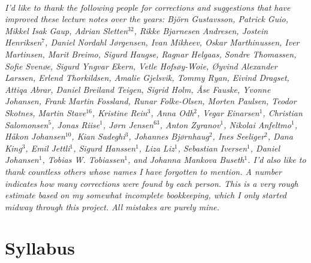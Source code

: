 \documentclass{tufte-book}
\begin{document}
\cleardoublepage
~\vfill
\begin{doublespace}
\noindent\fontsize{10}{10}\selectfont\itshape
\nohyphenation
I'd like to thank the following people for corrections and suggestions
that have improved these lecture notes over the years: Björn
Gustavsson, Patrick Guio,
Mikkel Isak Gaup, Adrian Sletten$^{32}$,
Rikke Bjarnesen Andresen, Jostein Henriksen$^7$, Daniel Nordahl Jørgensen,
Ivan Mikheev, Oskar Marthinussen, Iver Martinsen, Marit Breimo, Sigurd
Haugse, Ragnar Helgaas, Sondre Thomassen, Sofie Svenøe, Sigurd Yngvar
Ekern, Vetle Hofsøy-Woie, Øyvind Alexander Larssen, Erlend
Thorkildsen, Amalie Gjelsvik, Tommy Ryan, Eivind Dragset, Attiqa
Abrar, Daniel Breiland Teigen, Sigrid Holm, Åse Fauske, Yvonne
Johansen, Frank Martin Fossland, Runar Folke-Olsen, Morten Paulsen,
Teodor Skotnes,
Martin Stave$^{16}$, Kristine Rein$^{3}$, Anna Odh$^{2}$, Vegar
Einarsen$^{1}$, Christian Salomonsen$^{5}$, Jonas Riise$^{1}$, Jørn
Jensen$^{63}$, Anton Zyranov$^{1}$, Nikolai Anfeltmo$^{1}$, Håkon
Johansen$^{10}$, Kian Sadeghi$^{3}$, Johannes Bjørnhaug$^{2}$, Ines
Seeliger$^{2}$, Dana King$^{3}$, Emil Jettli$^{1}$, Sigurd
Hanssen$^{1}$, Liza Liz$^{1}$, Sebastian Iversen$^{1}$, Daniel
Johansen$^{1}$, Tobias W. Tobiassen$^{1}$, and Johanna Mankova
Buseth$^{1}$. I'd also like to thank countless others whose names I
have forgotten to mention. A number indicates how many corrections were
found by each person. This is a very rough estimate based on my
somewhat incomplete bookkeeping, which I only started midway through
this project. All mistakes are purely mine.
\end{doublespace}
\vfill
\vfill





\cleardoublepage


\ifSpSyllabus
\chapter{Syllabus} 

\fi


\ifSpIntro
\end{document}
